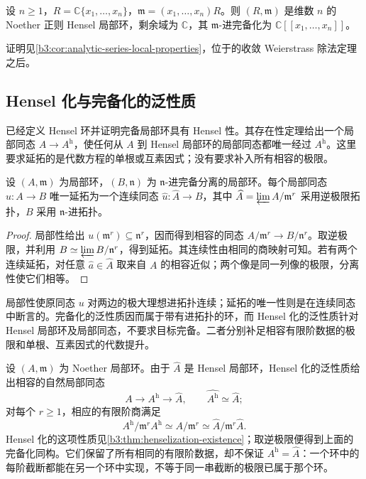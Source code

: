 \begin{theorem}[收敛幂级数环的基本性质]\label{b3:thm:convergent-series-local-properties}
	设 \(n\ge1\)，\(R=\mathbb C\{x_1,\ldots,x_n\}\)，\(\mathfrak m=(x_1,\ldots,x_n)R\)。则 \((R,\mathfrak m)\) 是维数 \(n\) 的 Noether 正则 Hensel 局部环，剩余域为 \(\mathbb C\)，其 \(\mathfrak m\)-进完备化为 \(\mathbb C[\![x_1,\ldots,x_n]\!]\)。
\end{theorem}

证明见\cref{b3:cor:analytic-series-local-properties}，位于的收敛 Weierstrass 除法定理之后。

\subsection{Hensel 化与完备化的泛性质}
\label{b3:subsec:D01:02}

已经定义 Hensel 环并证明完备局部环具有 Hensel 性。其存在性定理给出一个局部同态 \(A\to A^{\mathrm h}\)，使任何从 \(A\) 到 Hensel 局部环的局部同态都唯一经过 \(A^{\mathrm h}\)。这里要求延拓的是代数方程的单根或互素因式；没有要求补入所有相容的极限。

\begin{proposition}\label{b3:prop:completion-continuous-universal}
	设 \((A,\mathfrak m)\) 为局部环，\((B,\mathfrak n)\) 为 \(\mathfrak n\)-进完备分离的局部环。每个局部同态 \(u:A\to B\) 唯一延拓为一个连续同态 \(\widehat u:\widehat A\to B\)，其中 \(\widehat A=\varprojlim A/\mathfrak m^r\) 采用逆极限拓扑，\(B\) 采用 \(\mathfrak n\)-进拓扑。
\end{proposition}
\begin{proof}
	局部性给出 \(u(\mathfrak m^r)\subseteq\mathfrak n^r\)，因而得到相容的同态 \(A/\mathfrak m^r\to B/\mathfrak n^r\)。取逆极限，并利用 \(B\simeq\varprojlim B/\mathfrak n^r\)，得到延拓。其连续性由相同的商映射可知。若有两个连续延拓，对任意 \(\widehat a\in\widehat A\) 取来自 \(A\) 的相容近似；两个像是同一列像的极限，分离性使它们相等。
\end{proof}

局部性使原同态 \(u\) 对两边的极大理想进拓扑连续；延拓的唯一性则是在连续同态中断言的。完备化的泛性质因而属于带有进拓扑的环，而 Hensel 化的泛性质针对 Hensel 局部环及局部同态，不要求目标完备。二者分别补足相容有限阶数据的极限和单根、互素因式的代数提升。

\ProseParagraphBreak
设 \((A,\mathfrak m)\) 为 Noether 局部环。由于 \(\widehat A\) 是 Hensel 局部环，Hensel 化的泛性质给出相容的自然局部同态
\[
	A\longrightarrow A^{\mathrm h}\longrightarrow\widehat A, \qquad \widehat{A^{\mathrm h}}\simeq\widehat A;
\]
对每个 \(r\ge1\)，相应的有限阶商满足
\[
	A^{\mathrm h}/\mathfrak m^rA^{\mathrm h} \simeq A/\mathfrak m^r \simeq\widehat A/\mathfrak m^r\widehat A.
\]
Hensel 化的这项性质见\cref{b3:thm:henselization-existence}；取逆极限便得到上面的完备化同构。它们保留了所有相同的有限阶数据，却不保证 \(A^{\mathrm h}=\widehat A\)：一个环中的每阶截断都能在另一个环中实现，不等于同一串截断的极限已属于那个环。

